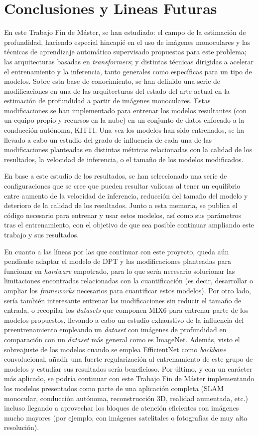\section{Conclusiones y Lineas Futuras}
En este Trabajo Fin de Máster, se han estudiado: el campo de la estimación de profundidad, haciendo especial hincapié en el uso de imágenes monoculares y las técnicas de aprendizaje automático supervisado propuestas para este problema; las arquitecturas basadas en \textit{transformers}; y distintas técnicas dirigidas a acelerar el entrenamiento y la inferencia, tanto generales como específicas para un tipo de modelos. Sobre esta base de conocimiento, se han definido una serie de modificaciones en una de las arquitecturas del estado del arte actual en la estimación de profundidad a partir de imágenes monoculares. Estas modificaciones se han implementado para entrenar los modelos resultantes (con un equipo propio y recursos en la nube) en un conjunto de datos enfocado a la conducción autónoma, KITTI. Una vez los modelos han sido entrenados, se ha llevado a cabo un estudio del grado de influencia de cada una de las modificaciones planteadas en distintas métricas relacionadas con la calidad de los resultados, la velocidad de inferencia, o el tamaño de los modelos modificados. 

En base a este estudio de los resultados, se han seleccionado una serie de configuraciones que se cree que pueden resultar valiosas al tener un equilibrio entre aumento de la velocidad de inferencia, reducción del tamaño del modelo y deterioro de la calidad de los resultados. Junto a esta memoria, se publica el código necesario para entrenar y usar estos modelos, así como sus parámetros tras el entrenamiento, con el objetivo de que sea posible continuar ampliando este trabajo y sus resultados.

En cuanto a las líneas por las que continuar con este proyecto, queda aún pendiente adaptar el modelo de DPT y las modificaciones planteadas para funcionar en \textit{hardware} empotrado, para lo que sería necesario solucionar las limitaciones encontradas relacionadas con la cuantificación (es decir, desarrollar o ampliar los \textit{frameworks} necesarios para cuantificar estos modelos). Por otro lado, sería también interesante entrenar las modificaciones sin reducir el tamaño de entrada, o recopilar los \textit{datasets} que componen MIX6 para entrenar parte de los modelos propuestos, llevando a cabo un estudio exhaustivo de la influencia del preentrenamiento empleando un \textit{dataset} con imágenes de profundidad en comparación con un \textit{dataset} más general como es ImageNet. Además, visto el sobreajuste de los modelos cuando se emplea EfficientNet como \textit{backbone} convolucional, añadir una fuerte regularización al entrenamiento de este grupo de modelos y estudiar sus resultados sería beneficioso. Por último, y con un carácter más aplicado, se podría continuar con este Trabajo Fin de Máster implementando los modelos presentados como parte de una aplicación completa (SLAM monocular, conducción autónoma, reconstrucción 3D, realidad aumentada, etc.) incluso llegando a aprovechar los bloques de atención eficientes con imágenes mucho mayores (por ejemplo, con imágenes satelitales o fotografías de muy alta resolución).

